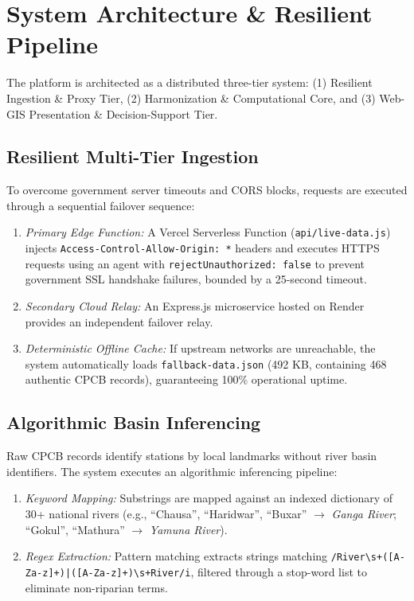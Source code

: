 \documentclass[conference]{IEEEtran}
\begin{document}
\section{System Architecture \& Resilient Pipeline}
The platform is architected as a distributed three-tier system: (1) Resilient Ingestion \& Proxy Tier, (2) Harmonization \& Computational Core, and (3) Web-GIS Presentation \& Decision-Support Tier.

\subsection{Resilient Multi-Tier Ingestion}
To overcome government server timeouts and CORS blocks, requests are executed through a sequential failover sequence:
\begin{enumerate}
    \item \textit{Primary Edge Function:} A Vercel Serverless Function (\texttt{api/live-data.js}) injects \texttt{Access-Control-Allow-Origin: *} headers and executes HTTPS requests using an agent with \texttt{rejectUnauthorized: false} to prevent government SSL handshake failures, bounded by a 25-second timeout.
    \item \textit{Secondary Cloud Relay:} An Express.js microservice hosted on Render provides an independent failover relay.
    \item \textit{Deterministic Offline Cache:} If upstream networks are unreachable, the system automatically loads \texttt{fallback-data.json} (492 KB, containing 468 authentic CPCB records), guaranteeing 100\% operational uptime.
\end{enumerate}

\subsection{Algorithmic Basin Inferencing}
Raw CPCB records identify stations by local landmarks without river basin identifiers. The system executes an algorithmic inferencing pipeline:
\begin{enumerate}
    \item \textit{Keyword Mapping:} Substrings are mapped against an indexed dictionary of 30+ national rivers (e.g., ``Chausa'', ``Haridwar'', ``Buxar'' $\rightarrow$ \textit{Ganga River}; ``Gokul'', ``Mathura'' $\rightarrow$ \textit{Yamuna River}).
    \item \textit{Regex Extraction:} Pattern matching extracts strings matching \texttt{/River\textbackslash s+([A-Za-z]+)|([A-Za-z]+)\textbackslash s+River/i}, filtered through a stop-word list to eliminate non-riparian terms.
\end{enumerate}
\end{document}
